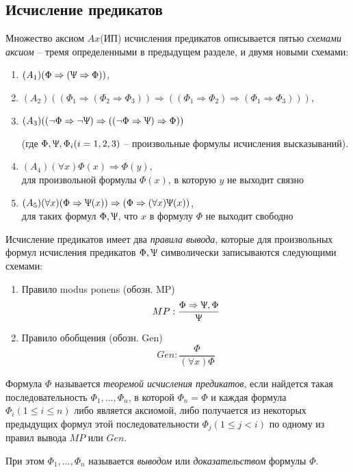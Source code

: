 \subsection*{Исчисление предикатов}
Множество аксиом $Ax$(ИП) исчисления предикатов описывается пятью \textit{схемами аксиом} -- тремя определенными в предыдущем разделе, и двумя новыми схемами:

\begin{enumerate}
    \item $(A_1)(\Phi\Rightarrow(\Uppsi\Rightarrow\Phi))$,

    \item $(A_2)((\Phi_1\Rightarrow(\Phi_2\Rightarrow\Phi_3))\Rightarrow((\Phi_1\Rightarrow\Phi_2)\Rightarrow(\Phi_1\Rightarrow\Phi_3)))$,
    
    \item $(A_3)((\lnot\Phi\Rightarrow\lnot\Uppsi)\Rightarrow((\lnot\Phi\Rightarrow\Uppsi)\Rightarrow\Phi))$
    
    (где $\Phi,\Uppsi,\Phi_i(i=1,2,3)$ -- произвольные формулы исчисления высказываний).
    \item $(A_4)(\forall x)\Phi(x)\Rightarrow\Phi(y)$, \\ для произвольной формулы $\Phi(x)$, в которую $y$ не выходит связно
    \item $(A_5)(\forall x)(\Phi\Rightarrow\Uppsi(x))\Rightarrow(\Phi\Rightarrow(\forall x)\Uppsi(x))$, \\ для таких формул $\Phi,\Uppsi$, что $x$ в формулу $\Phi$ не выходит свободно
\end{enumerate}

Исчисление предикатов имеет два \textit{правила вывода}, которые для произвольных формул исчисления предикатов $\Phi,\Uppsi$ символически записываются следующими схемами:
\begin{enumerate}
    \item Правило modus ponens (обозн. MP)
    $$MP: \frac{\Phi\Rightarrow\Uppsi,\Phi}{\Uppsi}$$
    \item Правило обобщения (обозн. Gen)
    $$Gen: \frac{\Phi}{(\forall x)\Phi}$$
\end{enumerate}

\begin{definition}
    Формула $\Phi$ называется \textit{теоремой исчисления предикатов}, если найдется такая последовательность $\Phi_1,\ldots,\Phi_n$, в которой $\Phi_n=\Phi$ и каждая формула $\Phi_i(1\leq i \leq n)$ либо является аксиомой, либо получается из некоторых предыдущих формул этой последовательности $\Phi_j(1\leq j < i)$ по одному из правил вывода $MP$ или $Gen$.

    При этом $\Phi_1,\ldots,\Phi_n$ называется \textit{выводом} или \textit{доказательством} формулы $\Phi$.
\end{definition}

